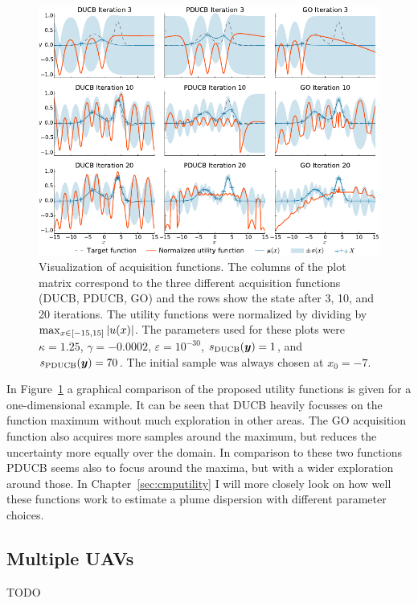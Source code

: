 \begin{figure}
    \centering
    \includegraphics{plots/acqfns}
    \caption[Visualization of acquisition functions]{Visualization of 
    acquisition functions. The columns of the plot matrix correspond to the 
    three different acquisition functions (DUCB, PDUCB, GO) and the rows show 
    the state after 3, 10, and 
        20 iterations.  The utility functions were normalized by dividing by 
           $\max_{x \in \intcc{-15, 15}} \abs[0]{u(x)}$.
        The parameters used for these plots were $\kappa = 1.25$, $\gamma 
        = -0.0002$, $\varepsilon = 10^{-30}$, $s_{\mathrm{DUCB}}(\bm{y}) = 1$, and 
        $s_{\mathrm{PDUCB}}(\bm{y}) = 70$. The initial sample was always chosen at $x_0 
        = -7$.}\label{fig:acqfns}
\end{figure}
In Figure~\ref{fig:acqfns} a graphical comparison of the proposed utility 
functions is given for a one-dimensional example. It can be seen that DUCB 
heavily focusses on the function maximum without much exploration in other 
areas. The GO acquisition function also acquires more samples around the 
maximum, but reduces the uncertainty more equally over the domain. In comparison 
to these two functions PDUCB seems also to focus around the maxima, but with 
a wider exploration around those. In Chapter~\ref{sec:cmputility} I will more 
closely look on how well these functions work to estimate a plume dispersion 
with different parameter choices.

\subsection{Multiple UAVs}
TODO

